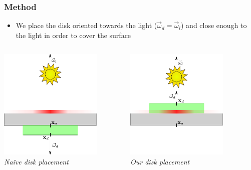 \documentclass{beamer}
\newcommand{\vomega}{\vec{\omega}}
\begin{document}
\begin{frame}
    \frametitle{Method}
			\begin{itemize}
			\item We place the disk oriented towards the light ($\vomega_d = \vomega_l$) and close enough to the light in order to cover the surface
			\end{itemize}
			\vspace{0.2cm}
			\begin{columns}
    \begin{column}{0.5\textwidth}
      \centering
		\includegraphics[width=0.8\textwidth]{distribution_wrong_1}
		\\\textit{Naïve disk placement}
				\end{column}
    \begin{column}{0.5\textwidth}
      \centering
		\includegraphics[width=0.8\textwidth]{distribution_wrong_2}
		\\\textit{Our disk placement}
    \end{column}
​  \end{columns}

\end{frame}
\end{document}
